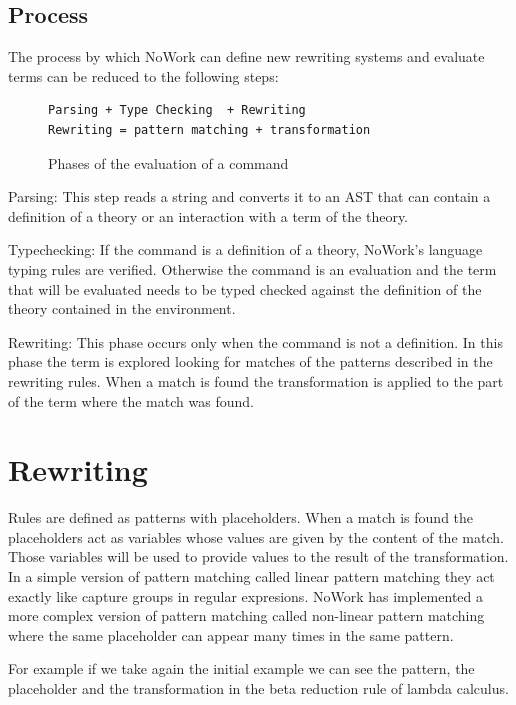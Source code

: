 \documentclass[12pt,a4paper]{article}
\begin{document}
\subsection{Process}

The process by which NoWork can define new rewriting systems and
evaluate terms can be reduced to the following steps:

\begin{figure}[!h]
\begin{verbatim}
Parsing + Type Checking  + Rewriting
Rewriting = pattern matching + transformation
\end{verbatim}
\caption{ Phases of the evaluation of a command }
\end{figure}

Parsing: This step reads a string and converts it to an AST that
can contain a definition of a theory or an interaction with a term
of the theory.

Typechecking: If the command is a definition of a theory, NoWork's
language typing rules are verified. Otherwise the command is an evaluation 
and the term that will be evaluated needs to be typed checked against the definition of
the theory contained in the environment.

Rewriting: This phase occurs only when the command is not a definition. 
In this phase the term is explored looking for matches of the patterns described in the
rewriting rules. When a match is found the transformation is applied to the part of the term where the match
was found.

\section{Rewriting}

Rules are defined as patterns with placeholders. 
When a match is found the placeholders act as variables whose
values are given by the content of the match. Those variables will be used to provide
values to the result of the transformation. In a simple version of pattern matching
called linear pattern matching they act exactly like capture groups in regular
expresions. NoWork has implemented a more complex version of
pattern matching called non-linear pattern matching where the same
placeholder can appear many times in the same pattern.

For example if we take again the initial example we can see the
pattern, the placeholder and the transformation in the beta reduction rule of 
lambda calculus.
\end{document}
